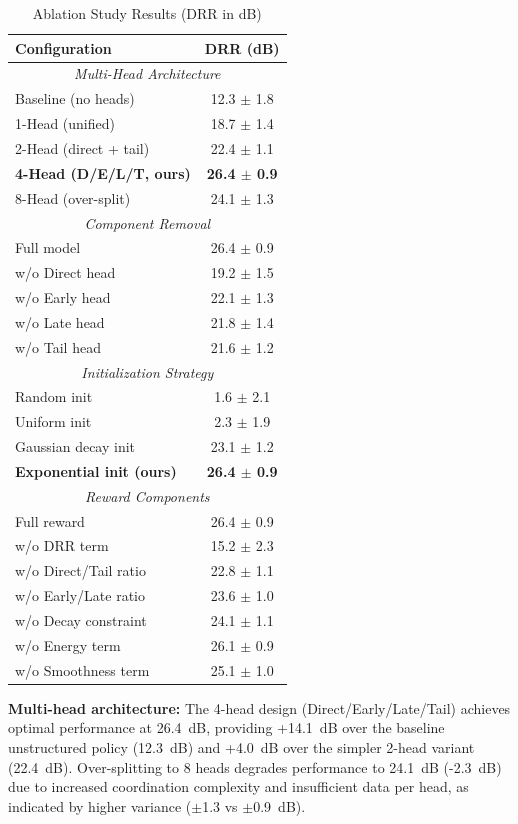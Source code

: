 \documentclass[10pt,conference]{IEEEtran}
\begin{document}
\begin{table}[t]
\centering
\caption{Ablation Study Results (DRR in dB)}
\label{tab:ablation}
\scriptsize
\begin{tabular}{@{}lc@{}}
\toprule
\textbf{Configuration} & \textbf{DRR (dB)} \\
\midrule
\multicolumn{2}{c}{\textit{Multi-Head Architecture}} \\
\midrule
Baseline (no heads) & 12.3 $\pm$ 1.8 \\
1-Head (unified) & 18.7 $\pm$ 1.4 \\
2-Head (direct + tail) & 22.4 $\pm$ 1.1 \\
\textbf{4-Head (D/E/L/T, ours)} & \textbf{26.4 $\pm$ 0.9} \\
8-Head (over-split) & 24.1 $\pm$ 1.3 \\
\midrule
\multicolumn{2}{c}{\textit{Component Removal}} \\
\midrule
Full model & 26.4 $\pm$ 0.9 \\
w/o Direct head & 19.2 $\pm$ 1.5 \\
w/o Early head & 22.1 $\pm$ 1.3 \\
w/o Late head & 21.8 $\pm$ 1.4 \\
w/o Tail head & 21.6 $\pm$ 1.2 \\
\midrule
\multicolumn{2}{c}{\textit{Initialization Strategy}} \\
\midrule
Random init & 1.6 $\pm$ 2.1 \\
Uniform init & 2.3 $\pm$ 1.9 \\
Gaussian decay init & 23.1 $\pm$ 1.2 \\
\textbf{Exponential init (ours)} & \textbf{26.4 $\pm$ 0.9} \\
\midrule
\multicolumn{2}{c}{\textit{Reward Components}} \\
\midrule
Full reward & 26.4 $\pm$ 0.9 \\
w/o DRR term & 15.2 $\pm$ 2.3 \\
w/o Direct/Tail ratio & 22.8 $\pm$ 1.1 \\
w/o Early/Late ratio & 23.6 $\pm$ 1.0 \\
w/o Decay constraint & 24.1 $\pm$ 1.1 \\
w/o Energy term & 26.1 $\pm$ 0.9 \\
w/o Smoothness term & 25.1 $\pm$ 1.0 \\
\bottomrule
\end{tabular}
\end{table}

\textbf{Multi-head architecture:} The 4-head design (Direct/Early/Late/Tail) achieves optimal performance at 26.4~dB, providing +14.1~dB over the baseline unstructured policy (12.3~dB) and +4.0~dB over the simpler 2-head variant (22.4~dB). Over-splitting to 8 heads degrades performance to 24.1~dB (-2.3~dB) due to increased coordination complexity and insufficient data per head, as indicated by higher variance ($\pm$1.3 vs $\pm$0.9~dB).
\end{document}
